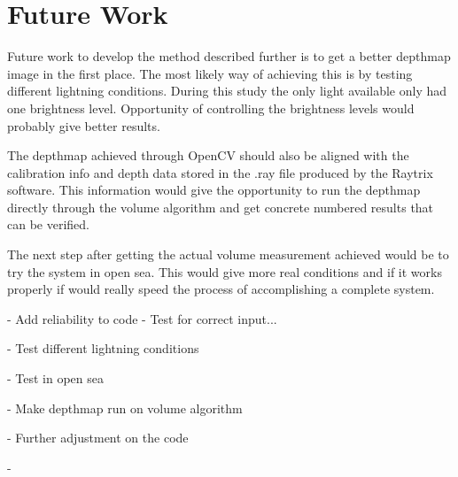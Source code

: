 \section{Future Work}

Future work to develop the method described further is to get a better depthmap image in the first place. The most likely way of achieving this is by testing different lightning conditions. During this study the only light available only had one brightness level. Opportunity of controlling the brightness levels would probably give better results. 

The depthmap achieved through OpenCV should also be aligned with the calibration info and depth data stored in the .ray file produced by the Raytrix software. This information would give the opportunity to run the depthmap directly through the volume algorithm and get concrete numbered results that can be verified.

The next step after getting the actual volume measurement achieved would be to try the system in open sea. This would give more real conditions and if it works properly if would really speed the process of accomplishing a complete system. 




{\color{red}

- Add reliability to code
    - Test for correct input...

- Test different lightning conditions

- Test in open sea

- Make depthmap run on volume algorithm

- Further adjustment on the code

- 
}